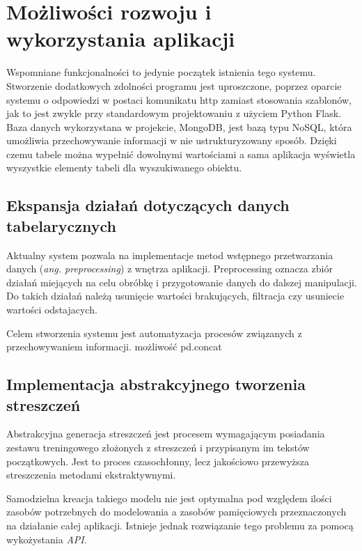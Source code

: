 \documentclass[12pt,a4paper,twoside]{article}
\begin{document}
\section{Możliwości rozwoju i wykorzystania aplikacji}
Wspomniane funkcjonalności to jedynie początek istnienia tego systemu. Stworzenie dodatkowych zdolności programu jest uproszczone, poprzez oparcie systemu o odpowiedzi w postaci komunikatu http zamiast stosowania szablonów, jak to jest zwykle przy standardowym projektowaniu z użyciem Python Flask. Baza danych wykorzystana w projekcie, MongoDB, jest bazą typu NoSQL, która umożliwia przechowywanie informacji w nie ustrukturyzowany sposób. Dzięki czemu tabele można wypełnić dowolnymi wartościami a sama aplikacja wyświetla wyszystkie elementy tabeli dla wyszukiwanego obiektu.\par
\subsection{Ekspansja działań dotyczących danych tabelarycznych}
Aktualny system pozwala na implementacje metod wstępnego przetwarzania danych (\textit{ang. preprocessing}) z wnętrza aplikacji. Preprocessing oznacza zbiór działań miejących na celu obróbkę i przygotowanie danych do dalszej manipulacji. Do takich działań należą usunięcie wartości brakujących, filtracja czy usuniecie wartości odstajacych. \par
Celem stworzenia systemu jest automatyzacja procesów związanych z przechowywaniem informacji. 
możliwość pd.concat
\subsection{Implementacja abstrakcyjnego tworzenia streszczeń}
Abstrakcyjna generacja streszczeń jest procesem wymagającym posiadania zestawu treningowego złożonych z streszczeń i przypisanym im tekstów początkowych. Jest to proces czasochłonny, lecz jakościowo przewyższa streszczenia metodami ekstraktywnymi. \par
Samodzielna kreacja takiego modelu nie jest optymalna pod względem ilości zasobów potrzebnych do modelowania a zasobów pamięciowych przeznaczonych na działanie całej aplikacji. Istnieje jednak rozwiązanie tego problemu za pomocą wykożystania \textit{API}. 
\end{document}
